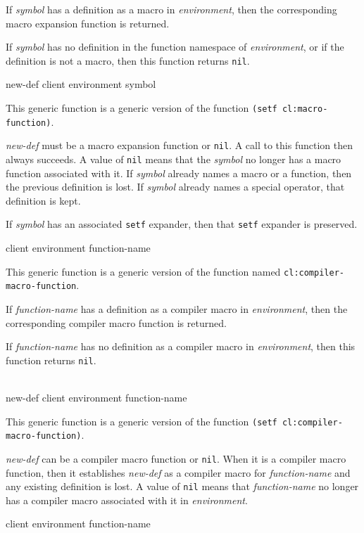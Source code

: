 If \textit{symbol} has a definition as a macro in
\textit{environment}, then the corresponding macro expansion function
is returned.

If \textit{symbol} has no definition in the function namespace of
\textit{environment}, or if the definition is not a macro, then this
function returns \texttt{nil}.

 {new-def client environment symbol}

This generic function is a generic version of the \commonlisp{}
function \texttt{(setf cl:macro-function)}.

\textit{new-def} must be a macro expansion function or \texttt{nil}.
A call to this function then always succeeds.  A value of \texttt{nil}
means that the \textit{symbol} no longer has a macro function
associated with it.  If \textit{symbol} already names a macro or a
function, then the previous definition is lost.  If \textit{symbol}
already names a special operator, that definition is kept.

If \textit{symbol} has an associated \texttt{setf} expander, then that
\texttt{setf} expander is preserved.

 {client environment function-name}

This generic function is a generic version of the \commonlisp{}
function named \texttt{cl:compiler-macro-function}.

If \textit{function-name} has a definition as a compiler macro in
\textit{environment}, then the corresponding compiler macro function
is returned.

If \textit{function-name} has no definition as a compiler macro in
\textit{environment}, then this function returns \texttt{nil}.

\\
{new-def client environment function-name}

This generic function is a generic version of the \commonlisp{}
function \texttt{(setf cl:compiler-macro-function)}.

\textit{new-def} can be a compiler macro function or \texttt{nil}.
When it is a compiler macro function, then it establishes
\textit{new-def} as a compiler macro for \textit{function-name} and
any existing definition is lost.  A value of \texttt{nil} means that
\textit{function-name} no longer has a compiler macro associated with
it in \textit{environment}.

 {client environment function-name}

